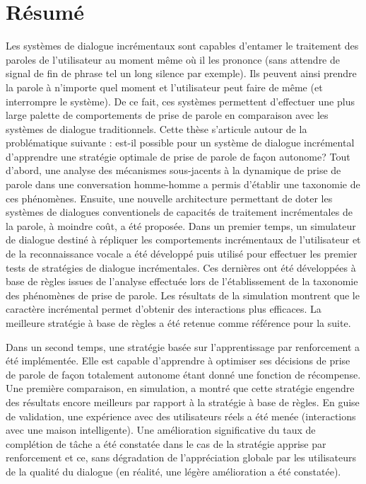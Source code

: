 \chapter*{R\'esum\'e}

     Les syst\`emes de dialogue incr\'ementaux sont capables d'entamer le traitement des paroles de l'utilisateur au moment m\^eme o\`u il les prononce (sans attendre de signal de fin de phrase tel un long silence par exemple). Ils peuvent ainsi prendre la parole \`a n'importe quel moment et l'utilisateur peut faire de m\^eme (et interrompre le syst\`eme). De ce fait, ces syst\`emes permettent d'effectuer une plus large palette de comportements de prise de parole en comparaison avec les syst\`emes de dialogue traditionnels. Cette th\`ese s'articule autour de la probl\'ematique suivante : est-il possible pour un syst\`eme de dialogue incr\'emental d'apprendre une strat\'egie optimale de prise de parole de fa\c con autonome? Tout d'abord, une analyse des m\'ecanismes sous-jacents \`a la dynamique de prise de parole dans une conversation homme-homme a permis d'\'etablir une taxonomie de ces ph\'enom\`enes. Ensuite, une nouvelle architecture permettant de doter les syst\`emes de dialogues conventionels de capacit\'es de traitement incr\'ementales de la parole, \`a moindre co\^ut, a \'et\'e propos\'ee. Dans un premier temps, un simulateur de dialogue destin\'e \`a r\'epliquer les comportements incr\'ementaux de l'utilisateur et de la reconnaissance vocale a \'et\'e d\'evelopp\'e puis utilis\'e pour effectuer les premier tests de strat\'egies de dialogue incr\'ementales. Ces derni\`eres ont \'et\'e d\'evelopp\'ees \`a base de r\`egles issues de l'analyse effectu\'ee lors de l'\'etablissement de la taxonomie des ph\'enom\`enes de prise de parole. Les r\'esultats de la simulation montrent que le caract\`ere incr\'emental permet d'obtenir des interactions plus efficaces. La meilleure strat\'egie \`a base de r\`egles a \'et\'e retenue comme r\'ef\'erence pour la suite.

     Dans un second temps, une strat\'egie bas\'ee sur l'apprentissage par renforcement a \'et\'e impl\'ement\'ee. Elle est capable d'apprendre \`a optimiser ses d\'ecisions de prise de parole de fa\c con totalement autonome \'etant donn\'e une fonction de r\'ecompense. Une premi\`ere comparaison, en simulation, a montr\'e que cette strat\'egie engendre des r\'esultats encore meilleurs par rapport \`a la strat\'egie \`a base de r\`egles. En guise de validation, une exp\'erience avec des utilisateurs r\'eels a \'et\'e men\'ee (interactions avec une maison intelligente). Une am\'elioration significative du taux de compl\'etion de t\^ache a \'et\'e constat\'ee dans le cas de la strat\'egie apprise par renforcement et ce, sans d\'egradation de l'appr\'eciation globale par les utilisateurs de la qualit\'e du dialogue (en r\'ealit\'e, une l\'eg\`ere am\'elioration a \'et\'e constat\'ee).
